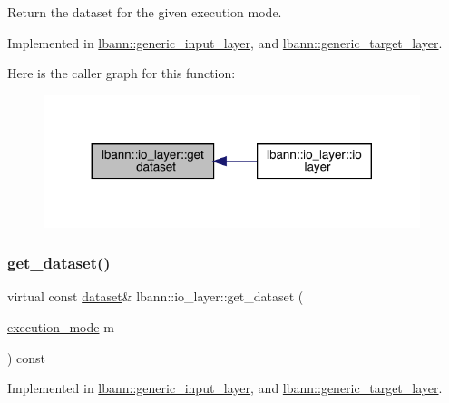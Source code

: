 Return the dataset for the given execution mode. 

Implemented in \hyperlink{classlbann_1_1generic__input__layer_af5699540797c22d8846028e578a6fc59}{lbann\+::generic\+\_\+input\+\_\+layer}, and \hyperlink{classlbann_1_1generic__target__layer_af2a0f4313863a029263efd0fced40571}{lbann\+::generic\+\_\+target\+\_\+layer}.

Here is the caller graph for this function\+:\nopagebreak
\begin{figure}[H]
\begin{center}
\leavevmode
\includegraphics[width=311pt]{classlbann_1_1io__layer_a027122c10603ede2ab9be779bad135f8_icgraph}
\end{center}
\end{figure}
\mbox{\label{classlbann_1_1io__layer_ac46dfddf41dc6915db433fe269b53770}} 
\subsubsection{\texorpdfstring{get\+\_\+dataset()}{get\_dataset()}\hspace{0.1cm}{\footnotesize\ttfamily [2/2]}}
{\footnotesize\ttfamily virtual const \hyperlink{classlbann_1_1dataset}{dataset}\& lbann\+::io\+\_\+layer\+::get\+\_\+dataset (\begin{DoxyParamCaption}\item[{\hyperlink{base_8hpp_a2781a159088df64ed7d47cc91c4dc0a8}{execution\+\_\+mode}}]{m }\end{DoxyParamCaption}) const\hspace{0.3cm}{\ttfamily [pure virtual]}}



Implemented in \hyperlink{classlbann_1_1generic__input__layer_a909cf972d13a305a16daba9664180262}{lbann\+::generic\+\_\+input\+\_\+layer}, and \hyperlink{classlbann_1_1generic__target__layer_a76569f34b5af75d6b822fb3349f7406f}{lbann\+::generic\+\_\+target\+\_\+layer}.

